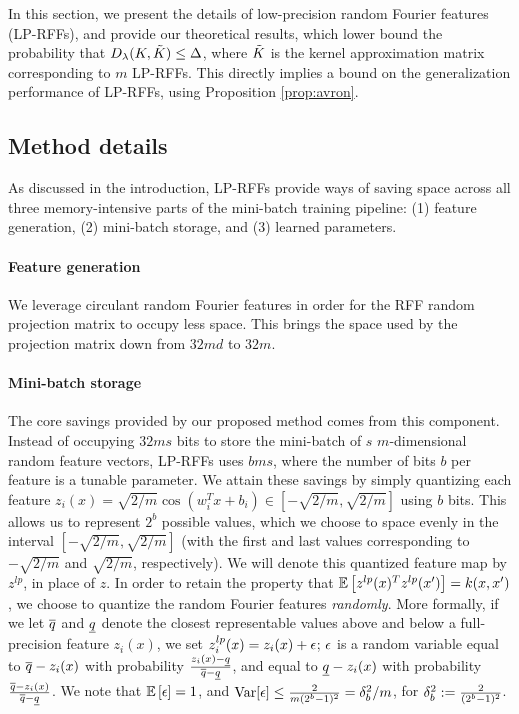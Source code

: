 In this section, we present the details of low-precision random Fourier features (LP-RFFs), and provide our theoretical results, which lower bound the probability that $D_{\lambda}(K,\tilde{K}) \leq \Delta$, where $\tilde{K}$ is the kernel approximation matrix corresponding to $m$ LP-RFFs.  This directly implies a bound on the generalization performance of LP-RFFs, using Proposition \ref{prop:avron}.

\subsection{Method details}
\label{subsec:method_details}
As discussed in the introduction, LP-RFFs provide ways of saving space across all three memory-intensive parts of the mini-batch training pipeline: (1) feature generation, (2) mini-batch storage, and (3) learned parameters.

\paragraph{Feature generation} We leverage circulant random Fourier features \citep{yu15} in order for the RFF random projection matrix to occupy less space. This brings the space used by the projection matrix down from $32md$ to $32m$.

\paragraph{Mini-batch storage} The core savings provided by our proposed method comes from this component.  Instead of occupying $32ms$ bits to store the mini-batch of $s$ $m$-dimensional random feature vectors, LP-RFFs uses $bms$, where the number of bits $b$ per feature is a tunable parameter.  We attain these savings by simply quantizing each feature $z_i(x) = \sqrt{2/m}\cos(w_i^T x + b_i) \in [-\sqrt{2/m},\sqrt{2/m}]$ using $b$ bits.  This allows us to represent $2^b$ possible values, which we choose to space evenly in the interval $[-\sqrt{2/m},\sqrt{2/m}]$ (with the first and last values corresponding to $-\sqrt{2/m}$ and $\sqrt{2/m}$, respectively). We will denote this quantized feature map by $z^{lp}$, in place of $z$. In order to retain the property that $\expect{}{z^{lp}(x)^T z^{lp}(x')} = k(x,x')$, we choose to quantize the random Fourier features \textit{randomly}.  More formally, if we let $\overline{q}$ and $\underline{q}$ denote the closest representable values above and below a full-precision feature $z_i(x)$, we set $z^{lp}_i(x) = z_i(x) + \epsilon$; $\epsilon$ is a random variable equal to $\overline{q} - z_i(x)$ with probability $\frac{z_i(x)-\underline{q}}{\overline{q}-\underline{q}}$, and equal to $\underline{q} - z_i(x)$ with probability $\frac{\overline{q}-z_i(x)}{\overline{q}-\underline{q}}$.  We note that $\expect{}{\eps} = 1$, and ${\rm Var}[\epsilon] \leq \frac{2}{m(2^b-1)^2} = \delta_b^2/m$, for $\delta_b^2 := \frac{2}{(2^b-1)^2}$.

